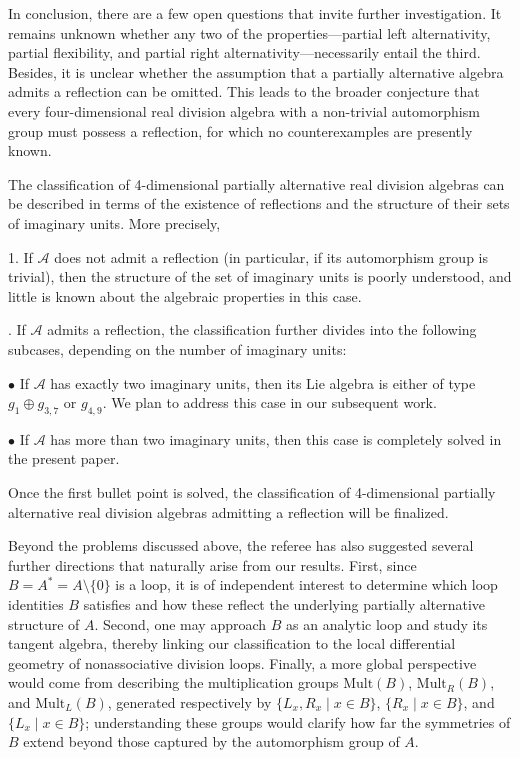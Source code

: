 \documentclass{amsart}
\theoremstyle{definition}
\theoremstyle{plain}
\begin{document}
\par\medskip

In conclusion, there are  a few open questions that invite further investigation.  It remains unknown whether any two of the properties—partial left alternativity, partial flexibility, and partial right alternativity—necessarily entail the third. Besides,  it is unclear whether the assumption that a partially alternative algebra admits a reflection can be omitted. This leads to the broader conjecture that every four-dimensional real division algebra with a non-trivial automorphism group must possess a reflection, for which no counterexamples are presently known. 

The classification of 4-dimensional partially alternative real division algebras  can be described in terms of the existence of reflections and the structure of their sets of imaginary units. More precisely, 

1. If $\mathcal A$  does not admit a reflection (in particular, if its automorphism group is trivial), then the structure of the set of imaginary units is poorly understood, and little is known about the algebraic properties in this case.
\par{}. If $\mathcal A$ admits a reflection, the classification further divides into the following subcases, depending on the number of imaginary units:
\par\medskip
$\bullet$ If $\mathcal A$ has exactly two imaginary units, then its Lie algebra is either of type $g_1\oplus g_{3,7}$ or $g_{4,9}.$ We plan to address this case  in our subsequent work. 
\par\medskip
$\bullet$ If  $\mathcal A$ has more than two imaginary units, then this case is completely solved in the present paper.

\par\medskip 
\noindent Once the first bullet point is solved, the classification of 4-dimensional partially alternative real division algebras admitting a reflection will be finalized.

\par\medskip
Beyond the problems discussed above, the referee has also suggested several further directions that naturally arise from our results. First, since $B = A^{\ast} = A \setminus \{0\}$ is a loop, it is of independent interest to determine which loop identities $B$ satisfies and how these reflect the underlying partially alternative structure of $A$. Second, one may approach $B$ as an analytic loop and study its tangent algebra, thereby linking our classification to the local differential geometry of nonassociative division loops. Finally, a more global perspective would come from describing the multiplication groups $\mathrm{Mult}(B)$, $\mathrm{Mult}_R(B)$, and $\mathrm{Mult}_L(B)$, generated respectively by $\{L_x, R_x \mid x \in B\}$, $\{R_x \mid x \in B\}$, and $\{L_x \mid x \in B\}$; understanding these groups would clarify how far the symmetries of $B$ extend beyond those captured by the automorphism group of $A$.
\end{document}
